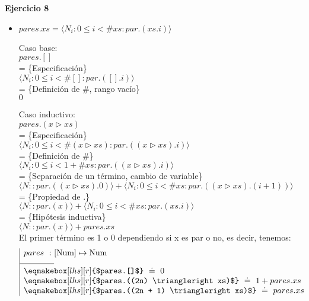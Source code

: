 \documentclass[12pt]{article}
\begin{document}
\textbf{Ejercicio 8}

\begin{itemize}
    \item $pares.xs = \langle N_i : 0 \le i < \#xs : par.(xs.i) \rangle$

    Caso base:\\
    $ pares.[] $\\
    = \{Especificación\}\\
    $ \langle N_i : 0 \le i < \#[] : par.([].i) \rangle $\\
    = \{Definición de \#, rango vacío\}\\
    $ 0 $

    \bigbreak

    Caso inductivo:\\
    $ pares.(x \triangleright xs) $\\
    = \{Especificación\}\\
    $ \langle N_i : 0 \le i < \#(x \triangleright xs) : par.((x \triangleright xs).i) \rangle $\\
    = \{Definición de \#\}\\
    $ \langle N_i : 0 \le i < 1 + \#xs : par.((x \triangleright xs).i) \rangle $\\
    = \{Separación de un término, cambio de variable\}\\
    $ \langle N :: par.((x \triangleright xs).0) \rangle + \langle N_i : 0 \le i < \#xs : par.((x \triangleright xs).(i + 1)) \rangle $\\
    = \{Propiedad de .\}\\
    $ \langle N :: par.(x) \rangle + \langle N_i : 0 \le i < \#xs : par.(xs.i) \rangle $\\
    = \{Hipótesis inductiva\}\\
    $ \langle N :: par.(x) \rangle + pares.xs $\\

    El primer término es 1 o 0 dependiendo si x es par o no, es decir, tenemos:
    \[
    \begin{array}{| r @{} l }
        \rule[-10pt]{0pt}{0pt}pares ~ : ~ & [\text{Num}] \mapsto \text{Num} \\
        \cline{1-1}
        \multicolumn{2}{|l}{\rule{0pt}{12pt}\eqmakebox[lhs][r]{$pares.[]$} ~ \doteq ~ 0} \\
        \multicolumn{2}{|l}{\eqmakebox[lhs][r]{$pares.((2n) \triangleright xs)$} ~ \doteq ~ 1 + pares.xs} \\
        \multicolumn{2}{|l}{\eqmakebox[lhs][r]{$pares.((2n + 1) \triangleright xs)$} ~ \doteq ~ pares.xs}
    \end{array}
    \]


\end{itemize}
\end{document}
